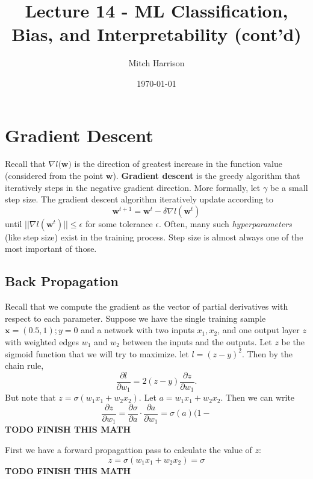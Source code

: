 \documentclass[titlepage, 12pt, leqno]{article}
\title{\Huge{Lecture 14 - ML Classification, Bias, and Interpretability
(cont'd)}}
\author{\large{Mitch Harrison}}
\date{\today}
\begin{document}
\setlength{\parskip}{1\baselineskip}
\setlength{\parindent}{15pt}
\maketitle
\tableofcontents
\newpage


\section{Gradient Descent}

Recall that $\nabla l(\textbf{w)}$ is the direction of greatest increase in the
function value (considered from the point $\textbf{w}$). \textbf{Gradient
descent} is the greedy algorithm that iteratively steps in the negative
gradient direction. More formally, let $\gamma$ be a small step size. The
gradient descent algorithm iteratively update according to
\[
\textbf{w}^{t+1} = \textbf{w}^{t} - \delta\nabla l(\textbf{w}^{t})
\]
until $||\nabla l(\textbf{w}^{t})||\le \epsilon $ for some tolerance $\epsilon$.
Often, many such \textit{hyperparameters} (like step size) exist in the training
process. Step size is almost always one of the most important of those.

\subsection{Back Propagation}

Recall that we compute the gradient as the vector of partial derivatives with
respect to each parameter. Suppose we have the single training sample
$\textbf{x} = (0.5,1); y = 0$ and a network with two inputs $x_{1}, x_{2}$, and
one output layer $z$ with weighted edges $w_{1}$ and $w_{2}$ between the 
inputs and the outputs. Let $z$ be the sigmoid function that we will try to
maximize. let $l = (z-y)^{2}$. Then by the chain rule,
\[
    \frac{\partial l}{\partial w_{1}} = 2(z-y)\frac{\partial z}{\partial w_{1}}.
\]
But note that $z = \sigma(w_{1}x_{1} + w_{2}x_{2})$. Let $a = w_{1}x_{1} 
+ w_{2}x_{2}$. Then we can write
\[
\frac{\partial z}{\partial w_{1}} = \frac{\partial \sigma}{\partial a}\cdot
\frac{\partial a}{\partial w_{1}} = \sigma(a)(1-
\]
\textbf{TODO FINISH THIS MATH}

First we have a forward propagattion pass to calculate the value of $z$:
\[
z = \sigma(w_{1}x_{1} + w_{2}x_{2}) = \sigma
\]
\textbf{TODO FINISH THIS MATH}
\end{document}
